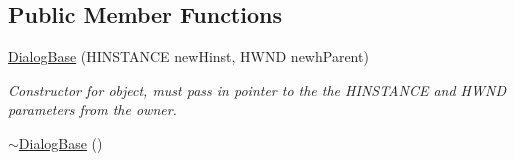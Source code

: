 \subsection*{Public Member Functions}
\begin{DoxyCompactItemize}
\item 
\hyperlink{class_dialog_base_a103817014aa779e00818e0602aac659e}{DialogBase} (HINSTANCE newHinst, HWND newhParent)
\begin{DoxyCompactList}\small\item\em Constructor for object, must pass in pointer to the the HINSTANCE and HWND parameters from the owner. \end{DoxyCompactList}\item 
\hypertarget{class_dialog_base_aa8db7393a807fdde47f0d5d3b7bccbf1}{
\hyperlink{class_dialog_base_aa8db7393a807fdde47f0d5d3b7bccbf1}{$\sim$DialogBase} ()}
\label{class_dialog_base_aa8db7393a807fdde47f0d5d3b7bccbf1}


\end{DoxyCompactItemize}
